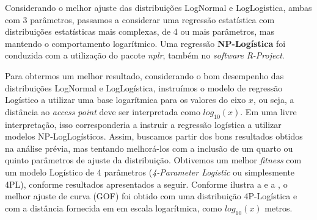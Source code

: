 \documentclass[
	12pt,				%
	twoside,			%
	a4paper,			%
	english,			%
	french,				%
	spanish,			%
	brazil				%
	]{abntex2}
\begin{document}
Considerando o melhor ajuste das distribuições LogNormal e LogLogistica,
ambas com 3 parâmetros, passamos a considerar uma regressão estatística
com distribuições estatísticas mais complexas, de 4 ou mais parâmetros,
mas mantendo o comportamento logarítmico. Uma regressão
\textbf{NP-Logística} foi conduzida com a utilização do pacote
\emph{nplr}, também no \emph{software} \emph{R-Project}.

Para obtermos um melhor resultado, considerando o bom desempenho das
distribuições LogNormal e LogLogística, instruímos o modelo de regressão
Logístico a utilizar uma base logarítmica para os valores do eixo \(x\),
ou seja, a distância ao \emph{access point} deve ser interpretada como
\(log_{10}(x)\). Em uma livre interpretação, isso corresponderia a
instruir a regressão logística a utilizar modelos NP-LogLogísticos.
Assim, buscamos partir dos bons resultados obtidos na análise prévia,
mas tentando melhorá-los com a inclusão de um quarto ou quinto
parâmetros de ajuste da distribuição. Obtivemos um melhor \emph{fitness}
com um modelo Logístico de 4 parâmetros (\emph{4-Parameter Logistic} ou
simplesmente 4PL), conforme resultados apresentados a seguir. Conforme
ilustra a e a , o melhor ajuste de curva (GOF) foi obtido com uma
distribuição 4P-Logística e com a distância fornecida em em escala
logarítmica, como \(log_{10}(x)\) metros.
\end{document}
